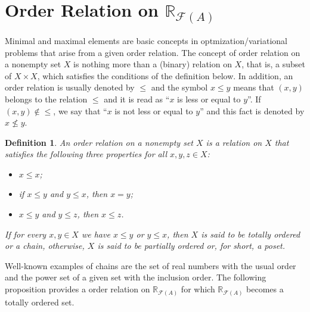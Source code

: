 \documentclass[12pt,a4paper]{article}
\newcommand{\RFA}{\mathbb{R}_{\mathcal{F}(A)}}
\newtheorem{definition}{Definition}
\begin{document}
\section{Order Relation on $\RFA$}

Minimal and maximal elements are basic concepts in optmization/variational problems that arise from a given order relation. The concept of order relation on a nonempty set $X$ is nothing more than a (binary) relation on $X$, that is, a subset of $X\times X$, which satisfies the conditions of the 
definition below. In addition, an order relation is usually denoted by $\leq$ and the symbol $x \leq y$ means that $(x,y)$ belongs to the relation $\leq$ and it is read as ``$x$ is less or equal to $y$''. If $(x,y) \not\in \leq$, we say that ``$x$ is not less or equal to $y$'' and this fact is denoted by $x\not\leq y$.

\begin{definition}\cite{birkhoff93}\label{def:order}
An order relation on a nonempty set $X$ is a relation on $X$ that satisfies the following three properties for all $x,y,z \in X$:
\begin{itemize}
    \item[i)] $x \leq x$;
    \item[ii)] if $x \leq y$ and $y \leq x$, then $x=y$;
    \item[iii)] $x \leq y$ and $y \leq z$, then $x\leq z$.
\end{itemize}

If for every $x,y \in X$ we have $x\leq y$ or $y \leq x$, then $X$ is said to be totally ordered or a chain, otherwise, $X$ is said to be partially ordered or, for short, a poset. 
\end{definition}


Well-known examples of chains are the set of real numbers with the usual order and the power set of a given set with the inclusion order. The following proposition provides a order relation on $\RFA$ for which $\RFA$ becomes a totally ordered set. 
\end{document}
